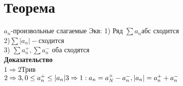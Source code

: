 \documentclass[12pt, a4paper]{article}
\begin{document}
      \section{Теорема}
       $ a_n $-произвольные слагаемые Экв:
       1) Ряд $ \sum a_n  $абс сходится\\
       2)$ \sum |a_n| -$сходится \\
       3) $ \sum a_n^+, \sum a_n^- $ оба сходятся\\
       \textbf{Доказательство}\\
       $ 1\Rightarrow 2 $Трив\\
       $   2\Rightarrow 3 , 0 \leq a_n^+ \leq |a_n| \\
       3\Rightarrow 1 : a_n = a_N^+ - a_n^- , |a_n| = a_n^+ +a_n^- \\
       $
         
        
       

	
	
   
\end{document}
